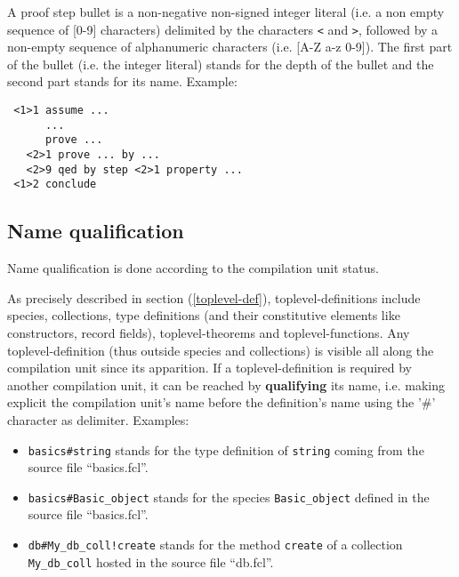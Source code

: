 A proof step bullet is a non-negative non-signed integer literal
(i.e. a non empty sequence of [0-9] characters) delimited by the
characters {\tt <} and {\tt >}, followed by a non-empty sequence of
alphanumeric characters (i.e. [A-Z a-z 0-9]). 
The first part of the bullet (i.e. the integer literal) stands for the
depth of the bullet and the second part stands for its name. Example:
{\scriptsize
\begin{lstlisting}
 <1>1 assume ...
      ...
      prove ...
   <2>1 prove ... by ...
   <2>9 qed by step <2>1 property ...
 <1>2 conclude
\end{lstlisting}
}



\subsection{Name qualification}
\label{qualified-name}
 

Name qualification is done according to the
compilation unit status. 


As precisely described in section (\ref{toplevel-def}), 
toplevel-definitions include species, collections, type definitions
(and their constitutive elements like constructors, record fields),
toplevel-theorems and toplevel-functions.  Any toplevel-definition (thus outside species
and collections) is visible all along the compilation unit since its
apparition.
If a toplevel-definition is required by another compilation unit, it can
be reached by {\bf qualifying} its name, i.e. making explicit the
compilation unit's name before the definition's name using the '\#'
character as delimiter. Examples:

\begin{itemize}
  \item {\tt basics\#string} stands for the type definition of
    {\tt string} coming from the source file ``basics.fcl''.
  \item {\tt  basics\#Basic\_object} stands for the species
    {\tt Basic\_object} defined in the source file ``basics.fcl''.
  \item {\tt db\#My\_db\_coll!create} stands for the method
    {\tt create} of a collection {\tt My\_db\_coll} hosted in the
    source file ``db.fcl''.
\end{itemize}

